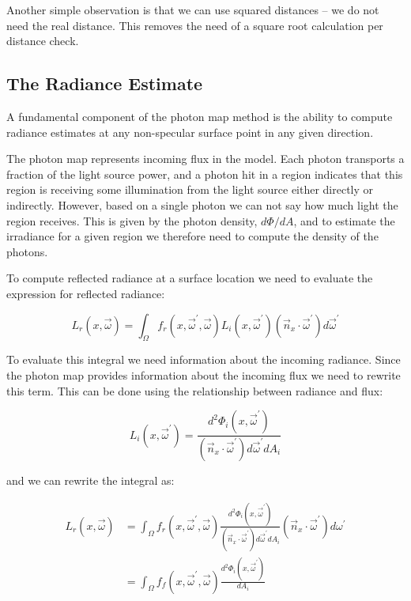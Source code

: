 Another simple observation is that we can use squared distances -- we do not need the real distance. This removes the need of a square root calculation per distance check.



\subsection{The Radiance Estimate}
A fundamental component of the photon map method is the ability to compute radiance estimates at any non-specular surface point in any given direction.

The photon map represents incoming flux in the model. Each photon transports a fraction of the light source power, and a photon hit in a region indicates that this region is receiving some illumination from the light source either directly or indirectly. However, based on a single photon we can not say how much light the region receives. This is given by the photon density, $d\Phi /dA$, and to estimate the irradiance for a given region we therefore need to compute the density of the photons.

To compute reflected radiance at a surface location we need to evaluate the expression for reflected radiance:

\begin{equation*}
	L_r(x,\vec{\omega})=\int_\Omega f_r(x,\vec{\omega}^{'},\vec{\omega})L_i(x,\vec{\omega}^{'})(\vec{n}_x\cdot\vec{\omega}^{'})d\vec{\omega}^{'}
\end{equation*}

To evaluate this integral we need information about the incoming radiance. Since the photon map provides information about the incoming flux we need to rewrite this term. This can be done using the relationship between radiance and flux:

\begin{equation*}
	L_i(x,\vec{\omega}^{'})=\frac{d^{2}\Phi_i(x,\vec{\omega}^{'})}{(\vec{n}_x\cdot\vec{\omega}^{'})d\vec{\omega}^{'} dA_i}	
\end{equation*}

and we can rewrite the integral as:

\begin{equation*}
\begin{aligned}
	L_r(x,\vec{\omega})&=\int_\Omega f_r(x,\vec{\omega}^{'},\vec{\omega}) \frac{d^{2}\Phi_i(x,\vec{\omega}^{'})}{(\vec{n}_x\cdot\vec{\omega}^{'})d\vec{\omega}^{'} dA_i}    (\vec{n}_x\cdot\vec{\omega}^{'})d\omega^{'}\\
	&=\int_\Omega f_f(x,\vec{\omega}^{'},\vec{\omega}) \frac{d^{2}\Phi_i(x,\vec{\omega}^{'})}{dA_i} 
\end{aligned}
\end{equation*}

